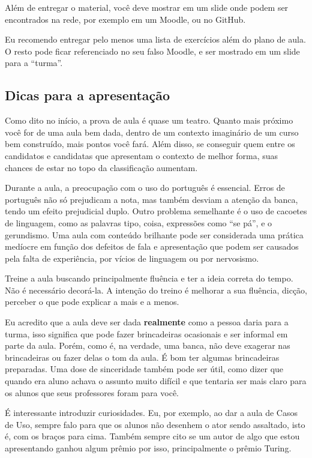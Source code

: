 \documentclass[12pt]{article}
\begin{document}
Além de entregar o material, você deve mostrar em um slide onde podem ser encontrados na rede, por exemplo em um Moodle, ou no GitHub.

Eu recomendo entregar pelo menos uma lista de exercícios além do plano de aula. O resto pode ficar referenciado no seu falso Moodle, e ser mostrado em um slide para a ``turma''.




\subsection{Dicas para a apresentação}

Como dito no início, a prova de aula é quase um teatro. Quanto mais próximo você for de uma aula bem dada, dentro de um contexto imaginário de um curso bem construído, mais pontos você fará. Além disso, se conseguir quem entre os candidatos e candidatas que apresentam o contexto de melhor forma, suas chances de estar no topo da classificação aumentam.

Durante a aula, a preocupação com o uso do português é essencial. Erros de português não só prejudicam a nota, mas também desviam a atenção da banca, tendo um efeito prejudicial duplo. Outro problema semelhante é o uso de cacoetes de linguagem, como as palavras tipo, coisa, expressões como ``se pá'', e o gerundismo. Uma aula com conteúdo brilhante pode ser considerada  uma prática medíocre em função dos defeitos de fala e apresentação que podem ser causados pela falta de experiência, por vícios de linguagem ou por nervosismo.

Treine a aula buscando principalmente fluência e ter a ideia correta do tempo. Não é necessário decorá-la. A intenção do treino é melhorar a sua fluência, dicção, perceber o que pode explicar a mais e a menos.

Eu acredito que a aula deve ser dada \textbf{realmente} como a pessoa daria para a turma, isso significa que pode fazer brincadeiras ocasionais e ser informal em parte da aula. Porém, como é, na verdade, uma banca, não deve exagerar nas brincadeiras ou fazer delas o tom da aula. É bom ter algumas brincadeiras preparadas. Uma dose de sinceridade também pode ser útil, como dizer que quando era aluno achava o assunto muito difícil e que tentaria ser mais claro para os alunos que seus professores foram para você.

É interessante introduzir curiosidades. Eu, por exemplo, ao dar a aula de Casos de Uso, sempre falo para que os alunos não desenhem o ator sendo assaltado, isto é, com os braços para cima. Também sempre cito se um autor de algo que estou apresentando ganhou algum prêmio por isso, principalmente o prêmio Turing.
\end{document}
